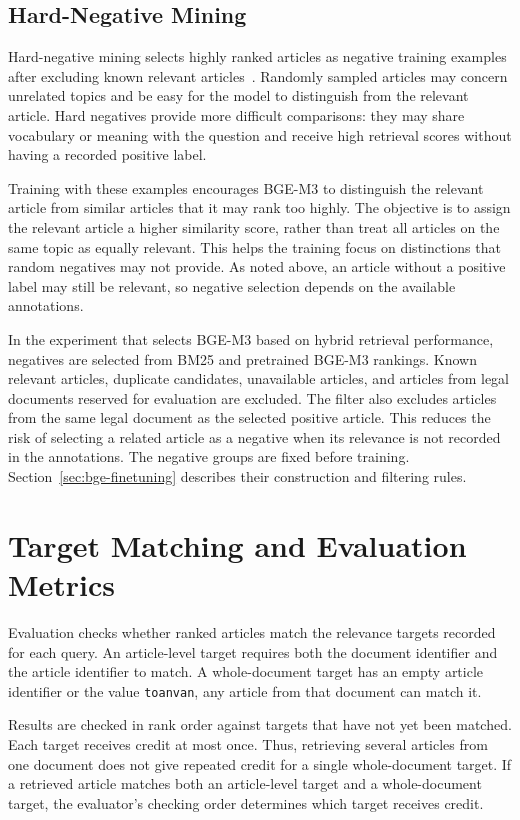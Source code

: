 \subsection{Hard-Negative Mining}

Hard-negative mining selects highly ranked articles as negative training examples after excluding known relevant articles~\cite{zhan2021}. Randomly sampled articles may concern unrelated topics and be easy for the model to distinguish from the relevant article. Hard negatives provide more difficult comparisons: they may share vocabulary or meaning with the question and receive high retrieval scores without having a recorded positive label.

Training with these examples encourages BGE-M3 to distinguish the relevant article from similar articles that it may rank too highly. The objective is to assign the relevant article a higher similarity score, rather than treat all articles on the same topic as equally relevant. This helps the training focus on distinctions that random negatives may not provide. As noted above, an article without a positive label may still be relevant, so negative selection depends on the available annotations.

In the experiment that selects BGE-M3 based on hybrid retrieval performance, negatives are selected from BM25 and pretrained BGE-M3 rankings. Known relevant articles, duplicate candidates, unavailable articles, and articles from legal documents reserved for evaluation are excluded. The filter also excludes articles from the same legal document as the selected positive article. This reduces the risk of selecting a related article as a negative when its relevance is not recorded in the annotations. The negative groups are fixed before training. Section~\ref{sec:bge-finetuning} describes their construction and filtering rules.

\section{Target Matching and Evaluation Metrics}
\label{sec:target-metrics}

Evaluation checks whether ranked articles match the relevance targets recorded for each query. An article-level target requires both the document identifier and the article identifier to match. A whole-document target has an empty article identifier or the value \texttt{toanvan}, any article from that document can match it.

Results are checked in rank order against targets that have not yet been matched. Each target receives credit at most once. Thus, retrieving several articles from one document does not give repeated credit for a single whole-document target. If a retrieved article matches both an article-level target and a whole-document target, the evaluator's checking order determines which target receives credit.

